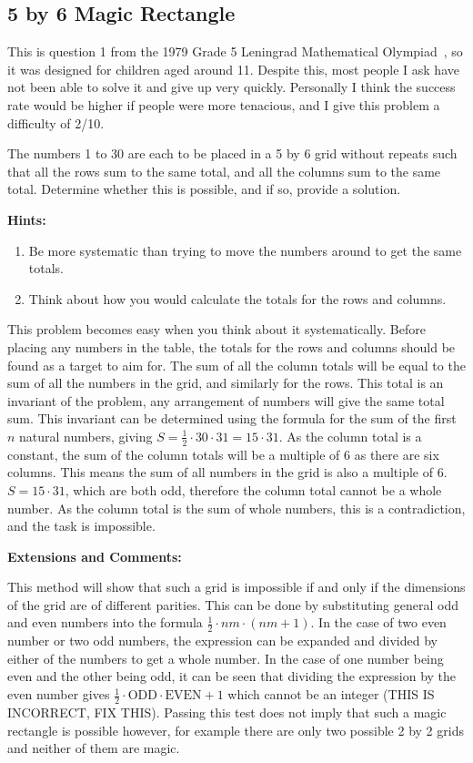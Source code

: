 
\subsection{5 by 6 Magic Rectangle}

This is question 1 from the 1979 Grade 5 Leningrad Mathematical Olympiad~\cite{Grade5LeningradOlympiad}, so it was designed for children aged around 11. Despite this, most people I ask have not been able to solve it and give up very quickly. Personally I think the success rate would be higher if people were more tenacious, and I give this problem a difficulty of 2/10.

The numbers 1 to 30 are each to be placed in a 5 by 6 grid without repeats such that all the rows sum to the same total, and all the columns sum to the same total. Determine whether this is possible, and if so, provide a solution.

\textbf{Hints:}

\begin{enumerate}
	\item Be more systematic than trying to move the numbers around to get the same totals.
	\item Think about how you would calculate the totals for the rows and columns.
\end{enumerate}

This problem becomes easy when you think about it systematically. Before placing any numbers in the table, the totals for the rows and columns should be found as a target to aim for. The sum of all the column totals will be equal to the sum of all the numbers in the grid, and similarly for the rows. This total is an invariant of the problem, any arrangement of numbers will give the same total sum. This invariant can be determined using the formula for the sum of the first $n$ natural numbers, giving $S = \frac{1}{2} \cdot 30 \cdot 31 = 15 \cdot 31$. As the column total is a constant, the sum of the column totals will be a multiple of 6 as there are six columns. This means the sum of all numbers in the grid is also a multiple of 6. $S = 15 \cdot 31$, which are both odd, therefore the column total cannot be a whole number. As the column total is the sum of whole numbers, this is a contradiction, and the task is impossible.

\textbf{Extensions and Comments:}

This method will show that such a grid is impossible if and only if the dimensions of the grid are of different parities. This can be done by substituting general odd and even numbers into the formula $\frac{1}{2} \cdot nm  \cdot (nm + 1)$. In the case of two even number or two odd numbers, the expression can be expanded and divided by either of the numbers to get a whole number. In the case of one number being even and the other being odd, it can be seen that dividing the expression by the even number gives $\frac{1}{2} \cdot \text{ODD} \cdot {\text{EVEN} + 1}$ which cannot be an integer (THIS IS INCORRECT, FIX THIS). Passing this test does not imply that such a magic rectangle is possible however, for example there are only two possible 2 by 2 grids and neither of them are magic.
